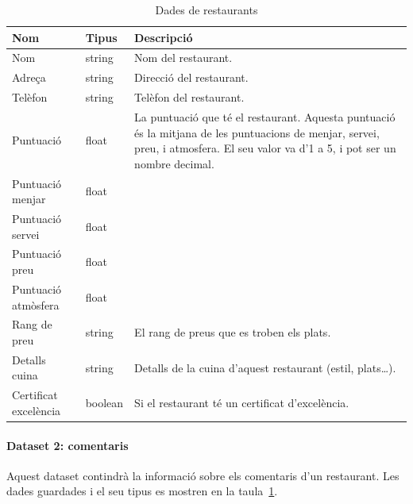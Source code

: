\documentclass{article}
\begin{document}
\begin{table}[h]
	\centering
    \begin{tabular}{|p{}|p{}|p{}|}
		\hline
        Nom       & Tipus  & Descripció \\\hline\hline
        Nom       & string & Nom del restaurant. \\\hline
        Adreça    & string & Direcció del restaurant. \\\hline
        Telèfon   & string & Telèfon del restaurant. \\\hline
        Puntuació & float  & La puntuació que té el restaurant. Aquesta
                             puntuació és la mitjana de les puntuacions de
                             menjar, servei, preu, i atmosfera. El seu valor
                             va d'1 a 5, i pot ser un nombre decimal. \\\hline
        Puntuació menjar & float & \\\hline
        Puntuació servei & float & \\\hline
        Puntuació preu & float & \\\hline
        Puntuació atmòsfera & float & \\\hline
		Rang de preu & string & El rang de preus que es troben els plats.\\\hline
        Detalls cuina & string & Detalls de la cuina d'aquest restaurant (estil,
                                 plats\dots). \\\hline
        Certificat excelència & boolean & Si el restaurant té un certificat
                                          d'excelència. \\\hline
    \end{tabular}
    \caption{Dades de restaurants}
    \label{table:dataset1_data}
\end{table}

\paragraph{Dataset 2: comentaris} %
Aquest dataset contindrà la informació sobre els comentaris d'un restaurant.
Les dades guardades i el seu tipus es mostren en la
taula~\ref{table:dataset1_data}.
\end{document}
